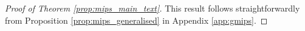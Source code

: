 

\begin{proof}[Proof of Theorem \ref{prop:mips_main_text}]
This result follows straightforwardly from Proposition \ref{prop:mips_generalised} in Appendix \ref{app:gmips}.    
\end{proof}


